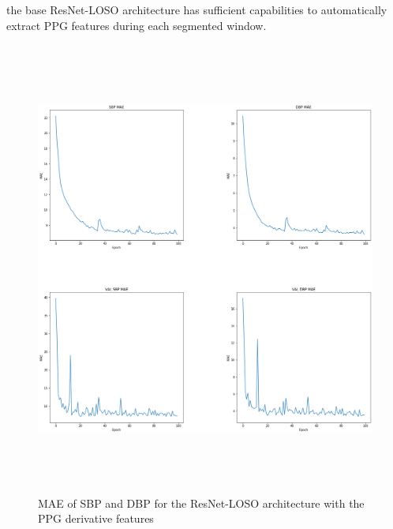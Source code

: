 the base ResNet-LOSO architecture has sufficient capabilities to automatically extract PPG features during 
each segmented window.
\begin{figure}[H]
    \centering
    \includegraphics[width=15cm,height=15cm,keepaspectratio]{Results/slapnicar.png}
    \caption{MAE of SBP and DBP for the ResNet-LOSO architecture with the PPG derivative features}
    \label{resnetLosoDerivResults}
\end{figure}


